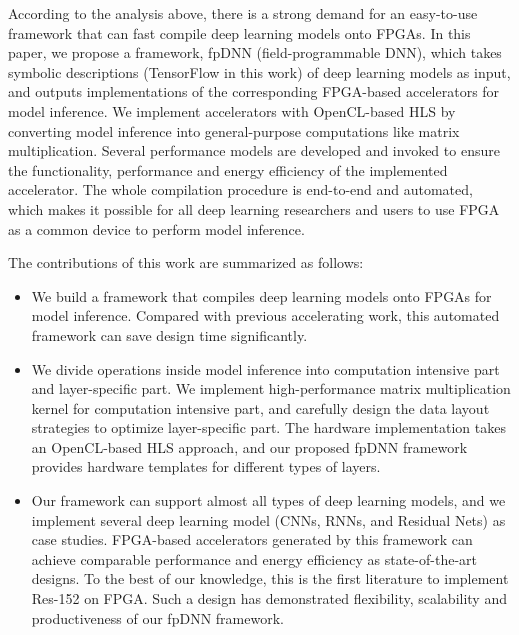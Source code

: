 \documentclass{acm_proc_article-sp-copy}
\begin{document}
According to the analysis above, there is a strong demand for an easy-to-use framework that can fast compile deep learning models onto FPGAs. In this paper, we propose a framework, fpDNN (field-programmable DNN), which takes symbolic descriptions (TensorFlow in this work) of deep learning models as input, and outputs implementations of the corresponding FPGA-based accelerators for model inference. We implement accelerators with OpenCL-based HLS by converting model inference into general-purpose computations like matrix multiplication. Several performance models are developed and invoked to ensure the functionality, performance and energy efficiency of the implemented accelerator. The whole compilation procedure is end-to-end and automated, which makes it possible for all deep learning researchers and users to use FPGA as a common device to perform model inference.

The contributions of this work are summarized as follows:
\begin{itemize}
\item We build a framework that compiles deep learning models onto FPGAs for model inference. Compared with previous accelerating work, this automated framework can save design time significantly. 
\item We divide operations inside model inference into computation intensive part and layer-specific part. We implement high-performance matrix multiplication kernel for computation intensive part, and carefully design the data layout strategies to optimize layer-specific part. The hardware implementation takes an OpenCL-based HLS approach, and our proposed fpDNN framework provides hardware templates for different types of layers. 

\item Our framework can support almost all types of deep learning models, and we implement several deep learning model (CNNs, RNNs, and Residual Nets) as case studies. FPGA-based accelerators generated by this framework can achieve comparable performance and energy efficiency as state-of-the-art designs. To the best of our knowledge, this is the first literature to implement Res-152 on FPGA. Such a design has demonstrated flexibility, scalability and productiveness of our fpDNN framework.
\end{itemize}
\end{document}
